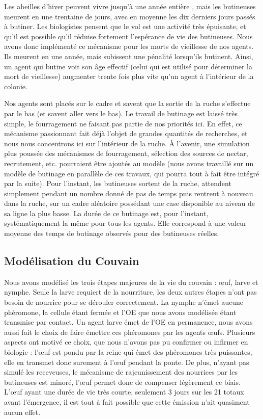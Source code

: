 		Les abeilles d'hiver peuvent vivre jusqu'à une année entière \cite{mattila_timing_2001}, mais les butineuses meurent en une trentaine de jours, avec en moyenne les dix derniers jours passés à butiner. Les biologistes pensent que le vol est une activité très épuisante, et qu'il est possible qu'il réduise fortement l'espérance de vie des butineuses. Nous avons donc implémenté ce mécanisme pour les morts de vieillesse de nos agents. Ils meurent en une année, mais subissent une pénalité lorsqu'ils butinent. Ainsi, un agent qui butine voit son âge effectif (celui qui est utilisé pour déterminer la mort de vieillesse) augmenter trente fois plus vite qu'un agent à l'intérieur de la colonie.
		
		Nos agents sont placés sur le cadre et savent que la sortie de la ruche s'effectue par le bas (et savent aller vers le bas). Le travail de butinage est laissé très simple, le fourragement ne faisant pas partie de nos priorités ici. En effet, ce mécanisme passionnant fait déjà l'objet de grandes quantités de recherches, et nous nous concentrons ici sur l'intérieur de la ruche. À l'avenir, une simulation plus poussée des mécanismes de fourragement, sélection des sources de nectar, recrutement, etc. pourraient être ajoutés au modèle (nous avons travaillé sur un modèle de butinage \cite{riviere_toward_2018,riviere_modemulti-agent_2021} en parallèle de ces travaux, qui pourra tout à fait être intégré par la suite). Pour l'instant, les butineuses sortent de la ruche, attendent simplement pendant un nombre donné de pas de temps puis rentrent à nouveau dans la ruche, sur un cadre aléatoire possédant une case disponible au niveau de sa ligne la plus basse. La durée de ce butinage est, pour l'instant, systématiquement la même pour tous les agents. Elle correspond à une valeur moyenne des temps de butinage observés pour des butineuses réelles.
		
		
		\subsection{Modélisation du Couvain}
		
			Nous avons modélisé les trois étapes majeures de la vie du couvain : œuf, larve et nymphe. Seule la larve requiert de la nourriture, les deux autres étapes n'ont pas besoin de nourrice pour se dérouler correctement. La nymphe n'émet aucune phéromone, la cellule étant fermée et l'OE que nous avons modélisée étant transmise par contact. Un agent larve émet de l'OE en permanence, nous avons aussi fait le choix de faire émettre ces phéromones par les agents œufs. Plusieurs aspects ont motivé ce choix, que nous n'avons pas pu confirmer ou infirmer en biologie : l'œuf est pondu par la reine qui émet des phéromones très puissantes, elle en transmet donc surement à l'œuf pendant la ponte. De plus, n'ayant pas simulé les receveuses, le mécanisme de rajeunissement des nourrices par les butineuses est minoré, l'œuf permet donc de compenser légèrement ce biais. L'œuf ayant une durée de vie très courte, seulement 3 jours sur les 21 totaux avant l'émergence, il est tout à fait possible que cette émission n'ait quasiment aucun effet.
			

